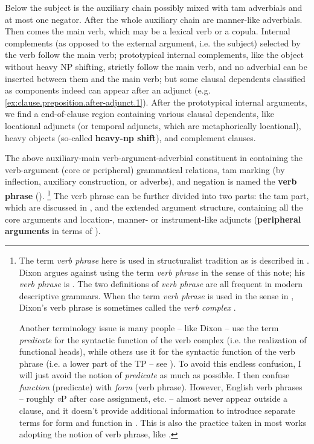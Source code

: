 \documentclass[UTF8, a4paper, oneside, scheme=plain, 12pt]{ctexbook}
\newcommand*{\concept}[1]{\textbf{#1}}
\newcommand*{\term}[1]{\emph{#1}}
\newcommand{\vP}{\textit{v}P}
\begin{document}
Below the subject is the auxiliary chain 
possibly mixed with \acs{tam} adverbials and at most one negator.
After the whole auxiliary chain are manner-like adverbials.
Then comes the main verb, which may be a lexical verb or a copula.
Internal complements (as opposed to the external argument, i.e. the subject) 
selected by the verb follow the main verb; 
prototypical internal complements, like the object without heavy NP shifting, 
strictly follow the main verb, 
and no adverbial can be inserted between them and the main verb; 
but some clausal dependents classified as components indeed can appear after an adjunct
(e.g. \ref{ex:clause.preposition.after-adjunct.1}).
After the prototypical internal arguments, 
we find a end-of-clause region containing various clausal dependents,
like locational adjuncts (or temporal adjuncts, which are metaphorically locational), 
heavy objects (so-called \concept{heavy-\acs{np} shift}), and complement clauses.

The above auxiliary-main verb-argument-adverbial constituent in  
containing the verb-argument (core or peripheral) grammatical relations,
\ac{tam} marking (by inflection, auxiliary construction, or adverbs), and negation
is named the \concept{verb phrase} ().%
\footnote{
    The term \term{verb phrase} here 
    is used in structuralist tradition as is described in \citet{cgel}.
    Dixon argues against using the term \term{verb phrase} in the sense of this note;
    his \term{verb phrase} is .
    The two definitions of \term{verb phrase} are all frequent in modern descriptive grammars.
    When the term \term{verb phrase} is used in the sense in ,
    Dixon's verb phrase is sometimes called the \term{verb complex} \citep{Friesen2017}.

    Another terminology issue is many people -- like Dixon -- use the term \term{predicate}
    for the syntactic function of the verb complex
    (i.e. the realization of functional heads),
    while others use it for the syntactic function of the verb phrase 
    (i.e. a lower part of the TP -- see ).
    To avoid this endless confusion, 
    I will just avoid the notion of \term{predicate} as much as possible.
    I then confuse \emph{function} (predicate)
    with \emph{form} (verb phrase).
    However, English verb phrases -- roughly \vP{} after case assignment, etc. -- 
    almost never appear outside a clause,
    and it doesn't provide additional information 
    to introduce separate terms for form and function in .
    This is also the practice taken in most works adopting the notion of verb phrase,
    like \citet{Friesen2017}.
}
The verb phrase can be further divided into two parts: 
the \acs{tam} part, 
which are discussed in ,
and the extended argument structure, 
containing all the core arguments and location-, manner- or instrument-like adjuncts 
(\concept{peripheral arguments} in terms of \citet{dixon2009basic1}).
\end{document}
